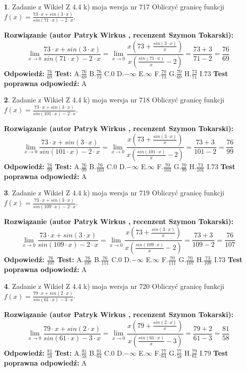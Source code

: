 \documentclass[12pt, a4paper]{article}
\theoremstyle{definition} %
\newtheorem{zad}{}
\newcommand{\zadStart}[1]{\begin{zad}#1\newline}
\newcommand{\zadStop}{\end{zad}}
\newcommand{\rozwStart}[2]{\noindent \textbf{Rozwiązanie (autor #1 , recenzent #2): }\newline}
\newcommand{\rozwStop}{\newline}
\newcommand{\odpStart}{\noindent \textbf{Odpowiedź:}\newline}
\newcommand{\odpStop}{\newline}
\newcommand{\testStart}{\noindent \textbf{Test:}\newline}
\newcommand{\testStop}{\newline}
\newcommand{\kluczStart}{\noindent \textbf{Test poprawna odpowiedź:}\newline}
\newcommand{\kluczStop}{\newline}
\begin{document}
\zadStart{Zadanie z Wikieł Z 4.4 k) moja wersja nr 717}
Obliczyć granicę funkcji $f(x)=\frac{73\cdot x +sin(3\cdot x)}{sin(71\cdot x) -2\cdot x}$.
\zadStop
\rozwStart{Patryk Wirkus}{Szymon Tokarski}
$$\lim\limits_{x\to 0}\frac{73\cdot x +sin(3\cdot x)}{sin(71\cdot x) -2\cdot x}
=\lim\limits_{x\to 0}\frac{x(73+\frac{sin(3\cdot x)}{x})}{x(\frac{sin(71\cdot x)}{x}-2)}
=\frac{73+3}{71-2} = \frac{76}{69}$$
\rozwStop
\odpStart
$\frac{76}{69}$
\odpStop
\testStart
A.$\frac{76}{69}$
B.$\frac{76}{73}$
C.$0$
D.$-\infty$
E.$\infty$
F.$\frac{70}{73}$
G.$\frac{70}{69}$
H.$\frac{73}{71}$
I.$73$
\testStop
\kluczStart
A
\kluczStop



\zadStart{Zadanie z Wikieł Z 4.4 k) moja wersja nr 718}
Obliczyć granicę funkcji $f(x)=\frac{73\cdot x +sin(3\cdot x)}{sin(101\cdot x) -2\cdot x}$.
\zadStop
\rozwStart{Patryk Wirkus}{Szymon Tokarski}
$$\lim\limits_{x\to 0}\frac{73\cdot x +sin(3\cdot x)}{sin(101\cdot x) -2\cdot x}
=\lim\limits_{x\to 0}\frac{x(73+\frac{sin(3\cdot x)}{x})}{x(\frac{sin(101\cdot x)}{x}-2)}
=\frac{73+3}{101-2} = \frac{76}{99}$$
\rozwStop
\odpStart
$\frac{76}{99}$
\odpStop
\testStart
A.$\frac{76}{99}$
B.$\frac{76}{103}$
C.$0$
D.$-\infty$
E.$\infty$
F.$\frac{70}{103}$
G.$\frac{70}{99}$
H.$\frac{73}{101}$
I.$73$
\testStop
\kluczStart
A
\kluczStop



\zadStart{Zadanie z Wikieł Z 4.4 k) moja wersja nr 719}
Obliczyć granicę funkcji $f(x)=\frac{73\cdot x +sin(3\cdot x)}{sin(109\cdot x) -2\cdot x}$.
\zadStop
\rozwStart{Patryk Wirkus}{Szymon Tokarski}
$$\lim\limits_{x\to 0}\frac{73\cdot x +sin(3\cdot x)}{sin(109\cdot x) -2\cdot x}
=\lim\limits_{x\to 0}\frac{x(73+\frac{sin(3\cdot x)}{x})}{x(\frac{sin(109\cdot x)}{x}-2)}
=\frac{73+3}{109-2} = \frac{76}{107}$$
\rozwStop
\odpStart
$\frac{76}{107}$
\odpStop
\testStart
A.$\frac{76}{107}$
B.$\frac{76}{111}$
C.$0$
D.$-\infty$
E.$\infty$
F.$\frac{70}{111}$
G.$\frac{70}{107}$
H.$\frac{73}{109}$
I.$73$
\testStop
\kluczStart
A
\kluczStop



\zadStart{Zadanie z Wikieł Z 4.4 k) moja wersja nr 720}
Obliczyć granicę funkcji $f(x)=\frac{79\cdot x +sin(2\cdot x)}{sin(61\cdot x) -3\cdot x}$.
\zadStop
\rozwStart{Patryk Wirkus}{Szymon Tokarski}
$$\lim\limits_{x\to 0}\frac{79\cdot x +sin(2\cdot x)}{sin(61\cdot x) -3\cdot x}
=\lim\limits_{x\to 0}\frac{x(79+\frac{sin(2\cdot x)}{x})}{x(\frac{sin(61\cdot x)}{x}-3)}
=\frac{79+2}{61-3} = \frac{81}{58}$$
\rozwStop
\odpStart
$\frac{81}{58}$
\odpStop
\testStart
A.$\frac{81}{58}$
B.$\frac{81}{64}$
C.$0$
D.$-\infty$
E.$\infty$
F.$\frac{77}{64}$
G.$\frac{77}{58}$
H.$\frac{79}{61}$
I.$79$
\testStop
\kluczStart
A
\kluczStop
\end{document}
